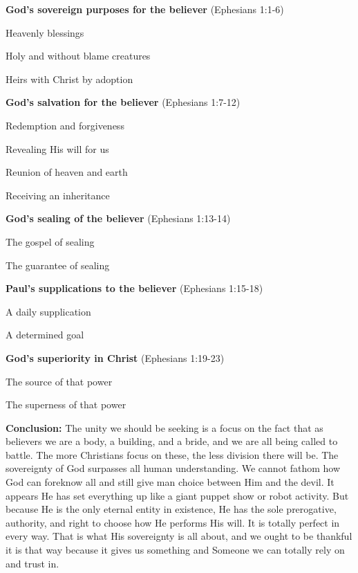 \begin{compactenum}[I.]
    \item \textbf{God’s sovereign purposes for the believer}  (Ephesians 1:1-6)
    \begin{compactenum}[A.]
    	\item Heavenly blessings
    	\item Holy and without blame creatures
    	\item Heirs with Christ by adoption
    \end{compactenum}
    \item \textbf{God’s salvation for the believer}  (Ephesians 1:7-12)
    \begin{compactenum}[A.]
    	\item Redemption and forgiveness
    	\item Revealing His will for us
    	\item Reunion of heaven and earth
    	\item Receiving an inheritance
    \end{compactenum}
    \item \textbf{God’s sealing of the believer}  (Ephesians 1:13-14)
    \begin{compactenum}[A.]
    	\item The gospel of sealing
    	\item The guarantee of sealing
    \end{compactenum}
    \item \textbf{Paul’s supplications to the believer}  (Ephesians 1:15-18)
    \begin{compactenum}[A.]
    	\item A daily supplication
    	\item A determined goal
    \end{compactenum}
    \item \textbf{God’s superiority in Christ}  (Ephesians 1:19-23)
    \begin{compactenum}[A.]
    	\item The source of that power
    	\item The superness of that power
    \end{compactenum}
\end{compactenum}
\textbf{Conclusion:} The unity we should be seeking is a focus on the fact that as believers we are a body, a building, and a bride, and we are all being called to battle. The more Christians focus on these, the less division there will be. The sovereignty of God surpasses all human understanding. We cannot fathom how God can foreknow all and still give man choice between Him and the devil. It appears He has set everything up like a giant puppet show or robot activity. But because He is the only eternal entity in existence, He has the sole prerogative, authority, and right to choose how He performs His will. It is totally perfect in every way. That is what His sovereignty is all about, and we ought to be thankful it is that way because it gives us something and Someone we can totally rely on and trust in.
